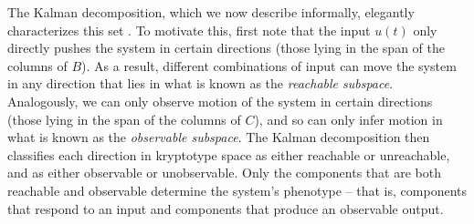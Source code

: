 \documentclass{article}
\newcommand{\1}{\mathbbm{1}}
\begin{document}
The Kalman decomposition, which we now describe informally, elegantly characterizes this set
\citep{kalman1963mathematical,kalman1969topics,anderson1966equivalence}.
To motivate this, first note that the input $u(t)$ only directly pushes the system
in certain directions (those lying in the span of the columns of $B$).
As a result, different combinations of input can 
move the system in any direction that lies in what is known as the \emph{reachable subspace}.
Analogously, we can only observe motion of the system in certain directions
(those lying in the span of the columns of $C$),
and so can only infer motion in what is known as the \emph{observable subspace}.
The Kalman decomposition then classifies each direction in kryptotype space
as either reachable or unreachable, and as either observable or unobservable.
Only the components that are both reachable and observable determine the system's phenotype --
that is, components that respond to an input and components that produce an observable output. 
\end{document}

